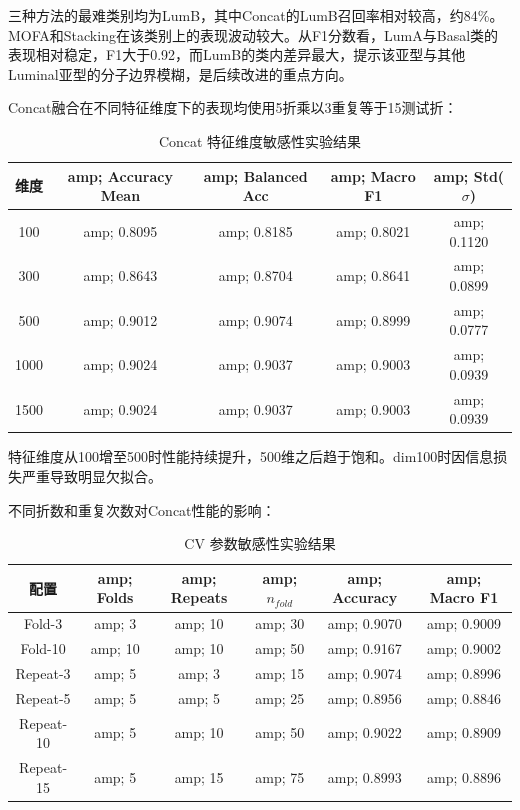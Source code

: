 三种方法的最难类别均为LumB，其中Concat的LumB召回率相对较高，约84\%。MOFA和Stacking在该类别上的表现波动较大。从F1分数看，LumA与Basal类的表现相对稳定，F1大于0.92，而LumB的类内差异最大，提示该亚型与其他Luminal亚型的分子边界模糊，是后续改进的重点方向。

Concat融合在不同特征维度下的表现均使用5折乘以3重复等于15测试折：

\begin{table}[H]
\centering
\caption{Concat 特征维度敏感性实验结果}
\label{tab:dim-sensitivity}
\begin{tabular}{ccccc}
\toprule
维度 &amp; Accuracy Mean &amp; Balanced Acc &amp; Macro F1 &amp; Std($\sigma$) \\
\midrule
100 &amp; 0.8095 &amp; 0.8185 &amp; 0.8021 &amp; 0.1120 \\
300 &amp; 0.8643 &amp; 0.8704 &amp; 0.8641 &amp; 0.0899 \\
500 &amp; 0.9012 &amp; 0.9074 &amp; 0.8999 &amp; 0.0777 \\
1000 &amp; 0.9024 &amp; 0.9037 &amp; 0.9003 &amp; 0.0939 \\
1500 &amp; 0.9024 &amp; 0.9037 &amp; 0.9003 &amp; 0.0939 \\
\bottomrule
\end{tabular}
\end{table}

特征维度从100增至500时性能持续提升，500维之后趋于饱和。dim100时因信息损失严重导致明显欠拟合。

不同折数和重复次数对Concat性能的影响：

\begin{table}[H]
\centering
\caption{CV 参数敏感性实验结果}
\label{tab:cv-sensitivity}
\begin{tabular}{cccccc}
\toprule
配置 &amp; Folds &amp; Repeats &amp; $n_{fold}$ &amp; Accuracy &amp; Macro F1 \\
\midrule
Fold-3 &amp; 3 &amp; 10 &amp; 30 &amp; 0.9070 &amp; 0.9009 \\
Fold-10 &amp; 10 &amp; 10 &amp; 50 &amp; 0.9167 &amp; 0.9002 \\
Repeat-3 &amp; 5 &amp; 3 &amp; 15 &amp; 0.9074 &amp; 0.8996 \\
Repeat-5 &amp; 5 &amp; 5 &amp; 25 &amp; 0.8956 &amp; 0.8846 \\
Repeat-10 &amp; 5 &amp; 10 &amp; 50 &amp; 0.9022 &amp; 0.8909 \\
Repeat-15 &amp; 5 &amp; 15 &amp; 75 &amp; 0.8993 &amp; 0.8896 \\
\bottomrule
\end{tabular}
\end{table}

